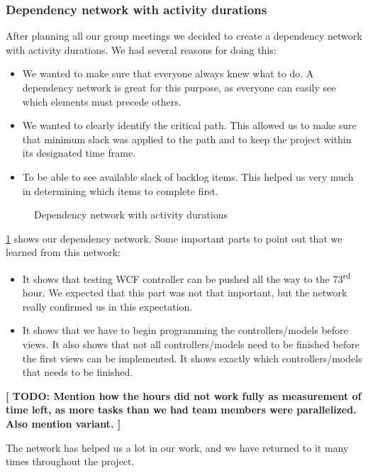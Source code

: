 \subsubsection{Dependency network with activity durations}
After planning all our group meetings we decided to create a dependency network with activity durations. We had several reasons for doing this:

\begin{itemize}
	\item We wanted to make sure that everyone always knew what to do. A dependency network is great for this purpose, as everyone can easily see which elements must precede others.
	\item We wanted to clearly identify the critical path. This allowed us to make sure that minimum slack was applied to the path and to keep the project within its designated time frame.
	\item To be able to see available slack of backlog items. This helped us very much in determining which items to complete first.
\end{itemize}

\begin{figure}[H]
  \caption{Dependency network with activity durations}
  \label{dependency network}
\end{figure}

\cref{dependency network} shows our dependency network.
Some important parts to point out that we learned from this network:
\begin{itemize}
	\item It shows that testing WCF controller can be pushed all the way to the 73\textsuperscript{rd} hour. We expected that this part was not that important, but the network really confirmed us in this expectation.
	\item It shows that we have to begin programming the controllers/models before views. It also shows that not all controllers/models need to be finished before the first views can be implemented. It shows exactly which controllers/models that needs to be finished.
\end{itemize}

\textbf{[ TODO: Mention how the hours did not work fully as measurement of time left, as more tasks than we had team members were parallelized. Also mention variant. ]}

The network has helped us a lot in our work, and we have returned to it many times throughout the project.